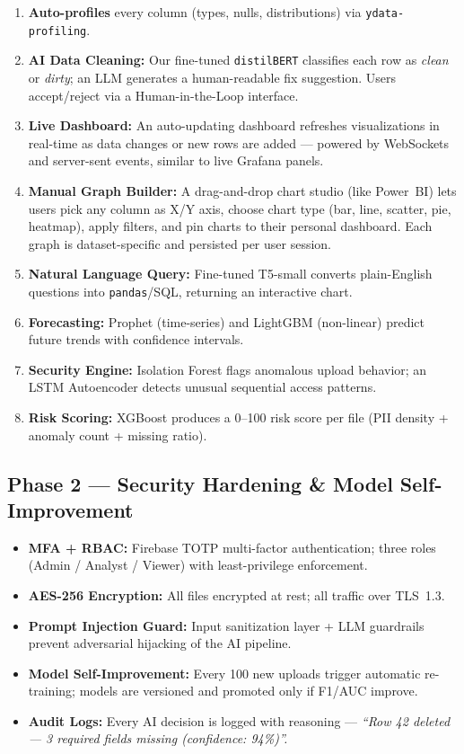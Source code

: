 \documentclass[10pt,twocolumn]{article}
\begin{document}
\begin{enumerate}
  \item \textbf{Auto-profiles} every column (types, nulls, distributions) via \texttt{ydata-profiling}.
  \item \textbf{AI Data Cleaning:} Our fine-tuned \texttt{distilBERT} classifies each row
        as \textit{clean} or \textit{dirty}; an LLM generates a human-readable fix suggestion.
        Users accept/reject via a Human-in-the-Loop interface.
  \item \textbf{Live Dashboard:} An auto-updating dashboard refreshes visualizations
        in real-time as data changes or new rows are added — powered by WebSockets
        and server-sent events, similar to live Grafana panels.
  \item \textbf{Manual Graph Builder:} A drag-and-drop chart studio (like Power~BI)
        lets users pick any column as X/Y axis, choose chart type (bar, line, scatter,
        pie, heatmap), apply filters, and pin charts to their personal dashboard.
        Each graph is dataset-specific and persisted per user session.
  \item \textbf{Natural Language Query:} Fine-tuned T5-small converts plain-English
        questions into \texttt{pandas}/SQL, returning an interactive chart.
  \item \textbf{Forecasting:} Prophet (time-series) and LightGBM (non-linear) predict
        future trends with confidence intervals.
  \item \textbf{Security Engine:} Isolation Forest flags anomalous upload behavior; an
        LSTM Autoencoder detects unusual sequential access patterns.
  \item \textbf{Risk Scoring:} XGBoost produces a 0--100 risk score per file (PII
        density + anomaly count + missing ratio).
\end{enumerate}

\subsection{Phase 2 — Security Hardening \& Model Self-Improvement}

\begin{itemize}
  \item \textbf{MFA + RBAC:} Firebase TOTP multi-factor authentication; three roles
        (Admin / Analyst / Viewer) with least-privilege enforcement.
  \item \textbf{AES-256 Encryption:} All files encrypted at rest; all traffic over TLS~1.3.
  \item \textbf{Prompt Injection Guard:} Input sanitization layer + LLM guardrails
        prevent adversarial hijacking of the AI pipeline.
  \item \textbf{Model Self-Improvement:} Every 100 new uploads trigger automatic
        re-training; models are versioned and promoted only if F1/AUC improve.
  \item \textbf{Audit Logs:} Every AI decision is logged with reasoning —
        \textit{``Row 42 deleted — 3 required fields missing (confidence: 94\%)''.}
\end{itemize}
\end{document}
